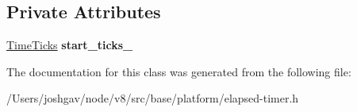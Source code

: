 \subsection*{Private Attributes}
\begin{DoxyCompactItemize}
\item 
\hyperlink{classv8_1_1base_1_1_time_ticks}{Time\+Ticks} {\bfseries start\+\_\+ticks\+\_\+}\hypertarget{classv8_1_1base_1_1_elapsed_timer_a32be5811eda90536f7577d793ae82474}{}\label{classv8_1_1base_1_1_elapsed_timer_a32be5811eda90536f7577d793ae82474}

\end{DoxyCompactItemize}


The documentation for this class was generated from the following file\+:\begin{DoxyCompactItemize}
\item 
/\+Users/joshgav/node/v8/src/base/platform/elapsed-\/timer.\+h\end{DoxyCompactItemize}
